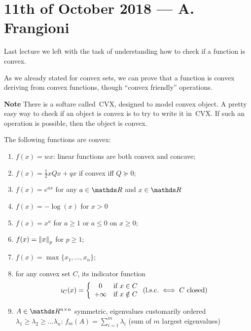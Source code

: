 \documentclass[computationalMathematics.tex]{subfiles}
\begin{document}
\section{11th of October 2018 --- A. Frangioni}

Last lecture we left with the task of understanding how to check if a function is convex.

As we already stated for convex sets, we can prove that a function is convex deriving from convex functions, though ``convex friendly'' operations.

\begin{myframe}{\bf Note}
There is a softare called~CVX, designed to model convex object. A pretty easy way to check if an object is convex is to try to write it in~CVX.
  If such an operation is possible, then the object is convex. 
\end{myframe}

The following functions are convex:

\begin{enumerate}
  \item $f(x) = w x$: linear functions are both convex and concave;
  \item $f(x) = \frac{1}{2} x Q x + q x$ if convex iff $Q \succeq 0$;
  \item $f(x) = e^{ax}$ for any $a \in \R$ and $x \in \R$
  \item $f(x) = -\log(x)$ for $x > 0$
  \item $f(x) = x^a$ for $a \geq 1$ or $a \leq 0$ on $x \geq 0$;
  \item $f(x) = \left\lVert x\right\rVert_p$ for $p \geq 1$;
  \item $f(x) = \max \{x_1, \ldots, x_n\}$;
  \item for any convex set $C$, its indicator function
        \[
         \mbox{\i}_C(x) =
         \left\{\begin{array}{cc} 0 & \mbox{if } x \in C \\
                            +\infty & \mbox{if } x \notin C
                \end{array}\right.
         \mbox{(l.s.c.} \iff C \mbox{ closed)}
        \]
  \item $A \in \R^{n \times n}$ symmetric, eigenvalues customarily ordered $\lambda_1 \geq \lambda_2 \geq \ldots \lambda_n$: $f_m(A) = \sum\limits_{i = 1}^m \lambda_i$ (sum of $m$ largest eigenvalues)
\end{enumerate}
\end{document}
